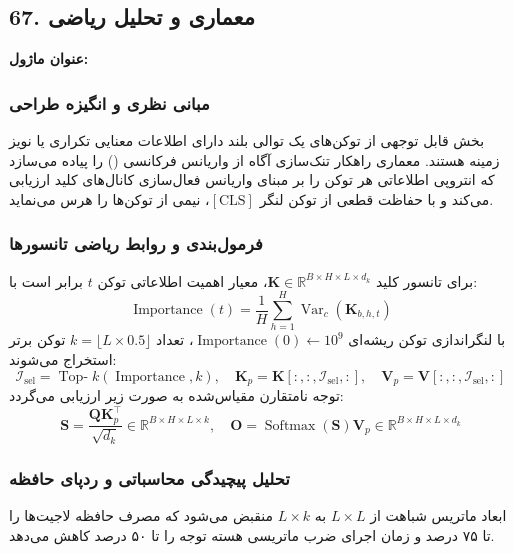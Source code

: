 \subsection*{67. معماری و تحلیل ریاضی }
\textbf{عنوان ماژول:} 

\subsubsection*{مبانی نظری و انگیزه طراحی}
بخش قابل توجهی از توکن‌های یک توالی بلند دارای اطلاعات معنایی تکراری یا نویز زمینه هستند. معماری  راهکار تنک‌سازی آگاه از واریانس فرکانسی () را پیاده می‌سازد که انتروپی اطلاعاتی هر توکن را بر مبنای واریانس فعال‌سازی کانال‌های کلید ارزیابی می‌کند و با حفاظت قطعی از توکن لنگر $[\text{CLS}]$، نیمی از توکن‌ها را هرس می‌نماید.

\subsubsection*{فرمول‌بندی و روابط ریاضی تانسورها}
برای تانسور کلید $\mathbf{K} \in \mathbb{R}^{B \times H \times L \times d_k}$، معیار اهمیت اطلاعاتی توکن $t$ برابر است با:
\begin{equation}
\operatorname{Importance}(t) = \frac{1}{H} \sum_{h=1}^H \operatorname{Var}_c(\mathbf{K}_{b, h, t})
\end{equation}
با لنگراندازی توکن ریشه‌ای $\operatorname{Importance}(0) \leftarrow 10^9$، تعداد $k = \lfloor L \times 0.5 \rfloor$ توکن برتر استخراج می‌شوند:
\begin{equation}
\mathcal{I}_{\text{sel}} = \operatorname{Top-}k(\operatorname{Importance}, k), \quad \mathbf{K}_p = \mathbf{K}[:, :, \mathcal{I}_{\text{sel}}, :], \quad \mathbf{V}_p = \mathbf{V}[:, :, \mathcal{I}_{\text{sel}}, :]
\end{equation}
توجه نامتقارن مقیاس‌شده به صورت زیر ارزیابی می‌گردد:
\begin{equation}
\mathbf{S} = \frac{\mathbf{Q} \mathbf{K}_p^\top}{\sqrt{d_k}} \in \mathbb{R}^{B \times H \times L \times k}, \quad \mathbf{O} = \operatorname{Softmax}(\mathbf{S}) \mathbf{V}_p \in \mathbb{R}^{B \times H \times L \times d_k}
\end{equation}

\subsubsection*{تحلیل پیچیدگی محاسباتی و ردپای حافظه}
ابعاد ماتریس شباهت از $L \times L$ به $L \times k$ منقبض می‌شود که مصرف حافظه لاجیت‌ها را تا ۷۵ درصد و زمان اجرای ضرب ماتریسی هسته توجه را تا ۵۰ درصد کاهش می‌دهد.


